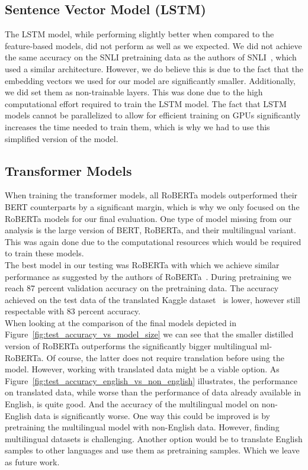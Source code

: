 \documentclass[acmsmall,nonacm]{acmart}
\begin{document}
\subsection{Sentence Vector Model (LSTM)}
The LSTM model, while performing slightly better when compared to the feature-based models, did not perform as well as we expected. We did not achieve the same accuracy on the SNLI pretraining data as the authors of SNLI~\cite{snli-bowman2015}, which used a similar architecture. However, we do believe this is due to the fact that the embedding vectors we used for our model are significantly smaller. Additionally, we did set them as non-trainable layers. This was done due to the high computational effort required to train the LSTM model. The fact that LSTM models cannot be parallelized to allow for efficient training on GPUs significantly increases the time needed to train them, which is why we had to use this simplified version of the model. 

\subsection{Transformer Models}
When training the transformer models, all RoBERTa models outperformed their BERT counterparts by a significant margin, which is why we only focused on the RoBERTa models for our final evaluation. One type of model missing from our analysis is the large version of BERT, RoBERTa, and their multilingual variant. This was again done due to the computational resources which would be required to train these models. \\
The best model in our testing was RoBERTa with which we achieve similar performance as suggested by the authors of RoBERTa~\cite{roberta-liu2019}. During pretraining we reach 87 percent validation accuracy on the pretraining data. 
The accuracy achieved on the test data of the translated Kaggle dataset~\cite{kaggle-dataset} is lower, however still respectable with 83 percent accuracy. \\
When looking at the comparison of the final models depicted in Figure~\ref{fig:test_accuracy_vs_model_size} we can see that the smaller distilled version of RoBERTa outperforms the significantly bigger multilingual ml-RoBERTa. Of course, the latter does not require translation before using the model. 
However, working with translated data might be a viable option. As Figure~\ref{fig:test_accuracy_english_vs_non_english} illustrates, the performance on translated data, while worse than the performance of data already available in English, is quite good. And the accuracy of the multilingual model on non-English data is significantly worse. One way this could be improved is by pretraining the multilingual model with non-English data. However, finding multilingual datasets is challenging. Another option would be to translate English samples to other languages and use them as pretraining samples. Which we leave as future work.
\end{document}
